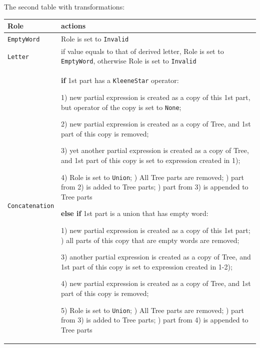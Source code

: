 \documentclass{article}
\begin{document}
\vspace{10pt}
The second table with transformations:

\vspace{10pt}
\noindent
\begin{tabularx}{\textwidth}{l|X}

Role & actions \\ \hline

\verb|EmptyWord| &

Role is set to \verb|Invalid| \\ \hline

\verb|Letter| &

if value equals to that of derived letter, Role is set to \verb|EmptyWord|, otherwise Role is set to
\verb|Invalid| \\ \hline

\verb|Concatenation| &

\textbf{if} 1st part has a \verb|KleeneStar| operator:

1) new partial expression is created as a copy of this 1st part, but operator of the copy is set to
\verb|None|;

2) new partial expression is created as a copy of Tree, and 1st part of this copy is removed;

3) yet another partial expression is created as a copy of Tree, and 1st part of this copy is set to
expression created in 1);

4) Role is set to \verb|Union|; \newline
5) All Tree parts are removed; \newline
6) part from 2) is added to Tree parts; \newline
7) part from 3) is appended to Tree parts

\vspace{5pt}
\textbf{else if} 1st part is a union that has empty word:

1) new partial expression is created as a copy of this 1st part; \newline
2) all parts of this copy that are empty words are removed;

3) another partial expression is created as a copy of Tree, and 1st part of this copy is set to
expression created in 1-2);

4) new partial expression is created as a copy of Tree, and 1st part of this copy is removed;

5) Role is set to \verb|Union|; \newline
6) All Tree parts are removed; \newline
7) part from 3) is added to Tree parts; \newline
8) part from 4) is appended to Tree parts


\end{tabularx}
\end{document}
